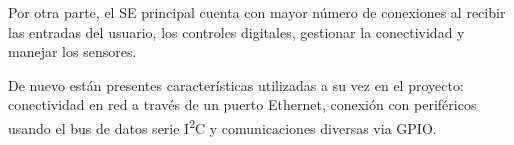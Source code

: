 Por otra parte, el SE principal cuenta con mayor número de conexiones al
recibir las entradas del usuario, los controles digitales, gestionar la
conectividad y manejar los sensores.

De nuevo están presentes características utilizadas a su vez en el proyecto:
conectividad en red a través de un puerto Ethernet, conexión con periféricos
usando el bus de datos serie I\textsuperscript{2}C y comunicaciones diversas via
GPIO.

